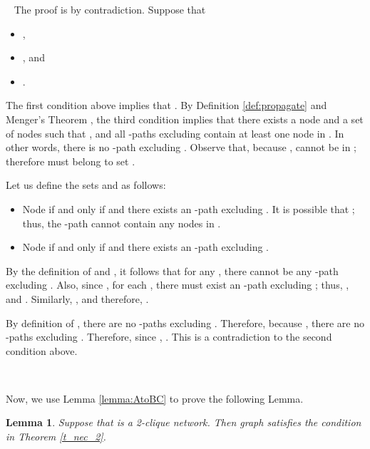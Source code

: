 \documentclass[letterpaper, 11pt]{article}
\newenvironment{proof}{\noindent {\bf Proof:}~}{\hspace*{\fill}}
\newtheorem{lemma}{Lemma}
\begin{document}
\begin{proof}
The proof is by contradiction. Suppose that 

\begin{itemize}
\item , 
\item , and
\item .

\end{itemize}
The first condition above implies that .
By Definition \ref{def:propagate} and Menger's Theorem \cite{Graph_theory_west}, the third condition implies that there exists a node  and a set of nodes  such that , and all -paths excluding  contain at least one node in .
In other words, there is no -path excluding .
Observe that, because
,  cannot be in ; therefore
 must belong to set .

Let us define the sets  and  as follows:
\begin{itemize}
\item Node  if and only if 
	and there exists an -path
	excluding .
	It is possible that ; thus, the -path
	cannot contain any nodes in . 
\item Node  if and only if   and there exists an -path
	excluding .
\end{itemize}

By the definition of  and , it follows that
for any , there cannot be any
-path excluding .
Also, since , for each ,
there must exist an -path excluding ; thus,
, and .
Similarly, , and therefore, .

By definition of , there are no -paths excluding
. Therefore, because , there are
no -paths excluding . Therefore,
since , . This is a contradiction to the second condition above.
\end{proof}

~

Now, we use Lemma \ref{lemma:AtoBC} to prove the following Lemma.

\begin{lemma}
\label{l_2clique}
Suppose that  is a 2-clique network.
Then graph  satisfies the condition in Theorem \ref{t_nec_2}.
\end{lemma}
\end{document}
